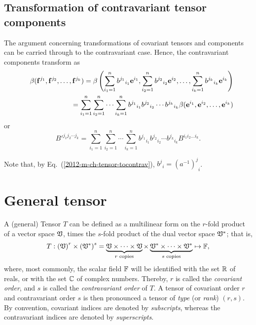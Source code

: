 \subsection{Transformation of contravariant tensor components}

The argument concerning transformations of covariant tensors and components
can be carried through to the contravariant case.
Hence, the contravariant components transform as
\begin{eqnarray}
&&\beta ( {{\bf f}}^{j_1},{{\bf f}}^{j_2},\ldots ,{{\bf f}}^{j_k})=
\beta \left(
\sum_{i_1=1}^n {b^{j_1}}_{i_1} {\bf e}^{i_1},
\sum_{i_2=1}^n {b^{j_2}}_{i_2} {\bf e}^{i_2},
\ldots ,
\sum_{i_k=1}^n {b^{j_k}}_{i_k} {\bf e}^{i_k}
\right)
\nonumber \\&& \quad
=
\sum_{i_1=1}^n\sum_{i_2=1}^n\cdots \sum_{i_k=1}^n
{b^{j_1}}_{i_1}{b^{j_2}}_{i_2}\cdots {b^{j_k}}_{i_k} \beta ( {\bf e}^{i_1},{\bf e}^{i_2},\ldots ,{\bf e}^{i_k})
 \label{2012-m-ch-tensor-etotccon1}
\end{eqnarray}
or
\begin{equation}
B'^{{j_1}{j_2}\cdots {j_k}}=
\sum_{i_1=1}^n\sum_{i_2=1}^n\cdots \sum_{i_k=1}^n
{b^{j_1}}_{i_1}{b^{j_2}}_{i_2}\cdots {b^{j_k}}_{i_k} B^{i_1 i_2\ldots i_k}.
 \label{2012-m-ch-tensor-etotccon2}
\end{equation}

Note that, by Eq.~(\ref{2012-m-ch-tensor-tocontrav}),
$ {b^j}_i =  {\left( a^{-1} \right)^j}_i$.


\section{General tensor}

A (general) Tensor $T$ can be defined as a multilinear form  on the
$r$-fold product of a vector space ${\frak V}$, times the
$s$-fold product of the dual vector space ${\frak V}^\ast$;
that is,
\begin{equation}
T: \left( {\frak V} \right)^r \times \left( {\frak V}^\ast \right)^s
=
\underbrace{{\frak V}\times \cdots \times {\frak V}}_{r\textrm{ \scriptsize copies}}
\times
\underbrace{{\frak V}^\ast \times \cdots \times {\frak V}^\ast}_{s\textrm{ \scriptsize copies}}
\mapsto {\Bbb F}
,
 \label{2012-m-ch-tensor-gdt}
\end{equation}
where, most commonly, the scalar field
${\Bbb F}$
will be identified with the set ${\Bbb R}$ of reals,
or with the set ${\Bbb C}$ of complex numbers.
Thereby,
$r$ is called the
{\em covariant order}, and
$s$ is called the
{\em contravariant order}
of $T$.
A tensor of covariant order $r$ and contravariant order $s$
is then pronounced a tensor of
{\em type} (or {\em rank})
$(r,s)$.
By convention, covariant indices are denoted by {\em subscripts},
whereas the contravariant indices  are denoted by {\em superscripts}.


